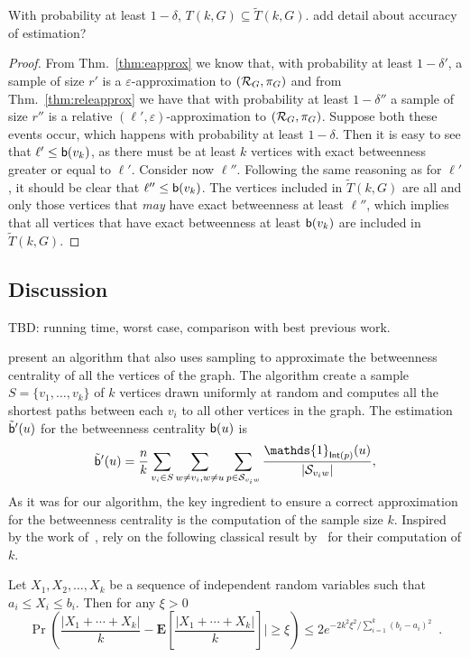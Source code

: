 \begin{lemma}
  With probability at least $1-\delta$, $T(k,G)\subseteq \tilde T(k,G)$.
  \XXX add detail about accuracy of estimation?
\end{lemma}
\begin{proof}
  From Thm.~\ref{thm:eapprox} we know that, with probability at least $1-\delta'$, a sample of size $r'$ is a
  $\varepsilon$-approximation to $(\mathcal{R}_G,\pi_G)$ and from
  Thm.~\ref{thm:releapprox} we have that with probability at least
  $1-\delta''$ a sample of size $r''$ is a relative
  $(\ell',\varepsilon)$-approximation to $(\mathcal{R}_G,\pi_G)$. Suppose both these events
  occur, which happens with probability at least $1-\delta$.
  Then it is easy to see that $\ell'\le\mathsf{b}(v_k)$, as there must be at least
  $k$ vertices with exact betweenness greater or equal to $\ell'$. 
  Consider now $\ell''$. Following the same reasoning as for $\ell'$, it should
  be clear that $\ell''\le\mathsf{b}(v_k)$. The vertices included in $\tilde T(k,G)$
  are all and only those vertices that \emph{may} have exact betweenness at least
  $\ell''$, which implies that all vertices that have exact betweenness at least
  $\mathsf{b}(v_k)$ are included in $\tilde T(k,G)$. 
\end{proof}

\subsection{Discussion}\label{sec:discussion}
\XXX TBD: running time, worst case, comparison with best previous work.

\citet{BrandesP07} present an algorithm that also uses sampling to approximate
the betweenness centrality of all the vertices of the graph. The algorithm
create a sample $S=\{v_1,\dotsc,v_k\}$ of $k$ vertices drawn uniformly at random 
and computes all the shortest paths between each $v_i$ to all other vertices in
the graph. The estimation $\tilde{\mathsf{b}}'(u)$ for the betweenness centrality
$\mathsf{b}(u)$ is
\[ 
\tilde\betw'(u)= \frac{n}{k}\sum_{v_i\in S}\sum_{w\neq v_i,w\neq
u}\sum_{p\in\mathcal{S}_{v_iw}}\frac{\mathds{1}_{\mathsf{Int}(p)}(u)}{|\mathcal{S}_{v_iw}|},
\]
As it was for our algorithm, the key ingredient to ensure a correct
approximation for the betweenness centrality is the computation of the sample
size $k$. Inspired by the work of~\citet{EppsteinW04}, \citet{BrandesP07} rely
on the following classical result by~\citet{Hoeffding63} for their computation
of $k$.

\begin{theorem}
  Let $X_1,X_2,\dotsc,X_k$ be a sequence of independent random variables
  such that $a_i\leq X_i\leq b_i$. Then for any $\xi > 0$
  \begin{equation}\label{eq:hoeffding}
    \Pr\left(\frac{|X_1+\dotsb+X_k|}{k}-\mathbf{E}\left[\frac{|X_1+\dotsb+X_k|}{k}\right]|\geq
    \xi\right)\leq 2e^{-2k^2\xi^2/\sum_{i=1}^{k}(b_{i}-a_{i})^2}\enspace.
  \end{equation}
\end{theorem}

